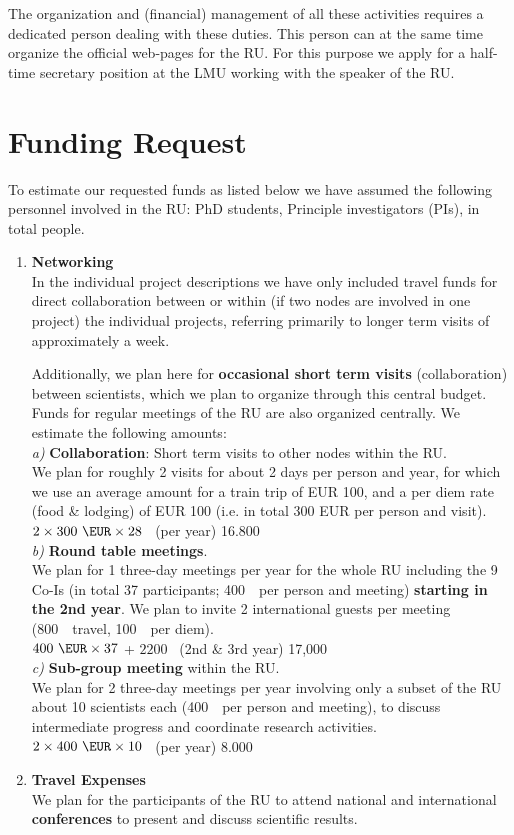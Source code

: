 \documentclass[10pt,fleqn,twoside]{article}
\begin{document}
The organization and (financial) management of all these activities requires
a dedicated person dealing with these duties. This person can at the same
time organize the official web-pages for the RU.  For this purpose we apply
for a half-time secretary position at the LMU working with the speaker of
the RU.
%
\section{Funding Request}
%
To estimate our requested funds as listed below we have assumed the
following personnel involved in the RU:  PhD students,
 Principle investigators (PIs), in total  people.
%
\begin{enumerate}
\item {\bf Networking} \\
In the individual project descriptions we have only included travel funds for
direct collaboration between or within (if two nodes are involved in one
project) the individual projects, referring primarily to longer term visits
of approximately a week.

Additionally, we plan here for {\bf occasional short term visits} (collaboration) between
scientists, which we plan to organize through this central budget. Funds for regular
meetings of the RU are also organized centrally. We estimate the following amounts:
\\[0.1cm]
 {\it a)} {\bf Collaboration}: Short term visits to other nodes within the RU. \\ 
 We plan for roughly 2 visits for about 2 days per person and year, for which we use
  an average amount for a train trip of EUR 100, and a per diem rate (food \& lodging)
  of EUR 100 (i.e. in total 300 EUR per person and visit).
\\[0.1cm]
\noindent
 $ 2 \times 300~\EUR \times 28  $  \, (per year)     \hfill 16.800~\EUR
\\[0.2cm]
\newpage
 {\it b)}  {\bf Round table meetings}. \\ 
 We plan for 1 three-day meetings per year for the whole RU including 
 the 9 Co-Is (in total 37 participants; 400~\EUR\ per person and meeting) 
  {\bf starting in the 2nd year}.
We plan to invite 
 2 international guests per meeting (800~\EUR\ travel, 100~\EUR\ per diem). 
\\[0.1cm]
 $ 400~\EUR \times 37  $  +  $2200$ \EUR \,  (2nd \& 3rd year)  \hfill 17,000~\EUR
\\[0.2cm]
 {\it c)}  {\bf Sub-group meeting} within the RU. \\
 We plan for 2 three-day meetings per year involving only a subset of the RU
 about 10 scientists each  (400~\EUR\ per person and meeting),
 to discuss intermediate progress and coordinate research activities.
\\[0.1cm]
 $ 2 \times 400~\EUR \times 10  $  \,  (per year)                \hfill  8.000~\EUR
\\[0.2cm]
%
%
\item {\bf Travel Expenses}\\
  We plan for the participants of the RU to attend national and
  international {\bf conferences} to present and discuss scientific results.


\end{enumerate}
\end{document}
